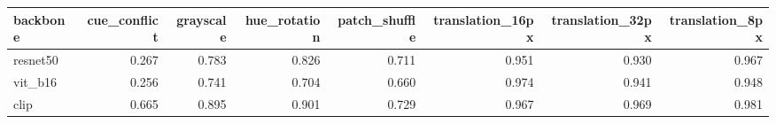\begin{tabular}{lrrrrrrr}
\toprule
backbone & cue_conflict & grayscale & hue_rotation & patch_shuffle & translation_16px & translation_32px & translation_8px \\
\midrule
resnet50 & 0.267 & 0.783 & 0.826 & 0.711 & 0.951 & 0.930 & 0.967 \\
vit_b16 & 0.256 & 0.741 & 0.704 & 0.660 & 0.974 & 0.941 & 0.948 \\
clip & 0.665 & 0.895 & 0.901 & 0.729 & 0.967 & 0.969 & 0.981 \\
\bottomrule
\end{tabular}
